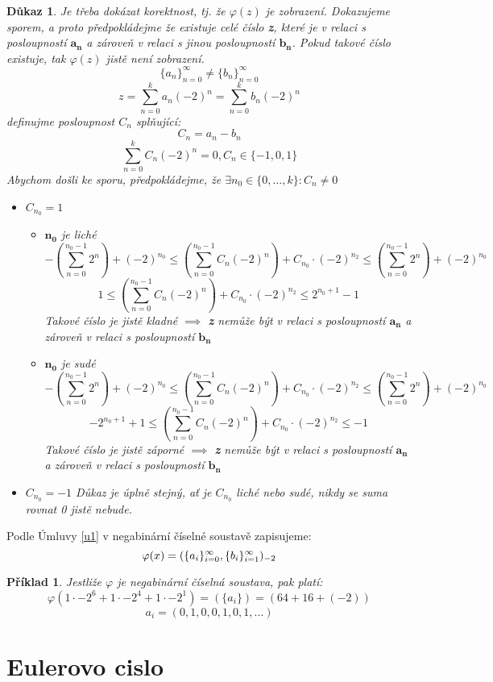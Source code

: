 \documentclass[12pt]{book}
\newtheorem{pr}{Příklad}
\newtheorem{dukaz}{Důkaz}
\begin{document}
\newpage
\begin{dukaz}
	Je třeba dokázat korektnost, tj. že $\varphi(z)$ je zobrazení.
	Dokazujeme sporem, a proto předpokládejme že existuje celé číslo \textbf{z}, které je v relaci s posloupností $\mathbf{a_n}$ a zároveň v relaci s jinou posloupností $\mathbf{b_n}$. Pokud takové číslo existuje, tak $\varphi(z)$ jistě není zobrazení.
	$$\{a_n\}_{n=0}^\infty \ne \{b_n\}_{n=0}^\infty$$ $$z=\sum_{n=0}^{k}a_n(-2)^n = \sum_{n=0}^{k}b_n(-2)^n$$
	definujme posloupnost $C_n$ splňující: $$C_n = a_n - b_n$$
	$$\sum_{n=0}^k C_n(-2)^n = 0 , C_n \in \{-1, 0 ,1\}$$
	Abychom došli ke sporu, předpokládejme, že $\exists n_0 \in \{0,...,k\}: C_n \ne 0$
	\begin{itemize}
		\item[$\alpha)$]$C_{n_0} = 1$
		\begin{itemize}
			\item[I.)] $\mathbf{n_0}$ je liché
			$$-\left(\sum_{n=0}^{n_0-1}2^n\right)+(-2)^{n_0}\leq \left(\sum_{n=0}^{n_0-1}C_n(-2)^n\right)+C_{n_0}\cdot(-2)^{n_2}  \leq\left(\sum_{n=0}^{n_0-1}2^n\right)+(-2)^{n_0}$$
			$$1\leq \left(\sum_{n=0}^{n_0-1}C_n(-2)^n\right)+C_{n_0}\cdot(-2)^{n_2}  \leq 2^{n_0 + 1}-1$$
			Takové číslo je jistě kladné $\implies$ \textbf{z} nemůže být v relaci s posloupností $\mathbf{a_n}$ a zároveň v relaci s posloupností $\mathbf{b_n}$
			\item[II.)]  $\mathbf{n_0}$ je sudé
			$$-\left(\sum_{n=0}^{n_0-1}2^n\right)+(-2)^{n_0}\leq \left(\sum_{n=0}^{n_0-1}C_n(-2)^n\right)+C_{n_0}\cdot(-2)^{n_2}  \leq\left(\sum_{n=0}^{n_0-1}2^n\right)+(-2)^{n_0}$$
			$$-2^{n_0+1}+1\leq \left(\sum_{n=0}^{n_0-1}C_n(-2)^n\right)+C_{n_0}\cdot(-2)^{n_2}  \leq -1$$
			Takové číslo je jistě záporné $\implies$ \textbf{z} nemůže být v relaci s posloupností $\mathbf{a_n}$ a zároveň v relaci s posloupností $\mathbf{b_n}$
			
		\end{itemize}
		\item[$\beta)$]$C_{n_0} = -1$\newline
		Důkaz je úplně stejný, ať je $C_{n_0}$ liché nebo sudé, nikdy se suma rovnat 0 jistě nebude.
	\end{itemize}
\end{dukaz}
\newpage
Podle Úmluvy \ref{u1} v negabinární číselné soustavě zapisujeme:
$$\varphi(x) = (\{a_i\}_{i=0}^{\infty},\{b_i\}_{i=1}^{\infty})_{-2}$$


\begin{pr}
	Jestliže $\varphi$ je negabinární číselná soustava, pak platí:
	$$\varphi(1\cdot-2^6+1\cdot-2^4+1\cdot-2^1)=(\{a_i\})=(64+16+(-2))$$
	$${a_i}=(0,1,0,0,1,0,1,...) $$
\end{pr}



\chapter{Eulerovo cislo}
\end{document}

